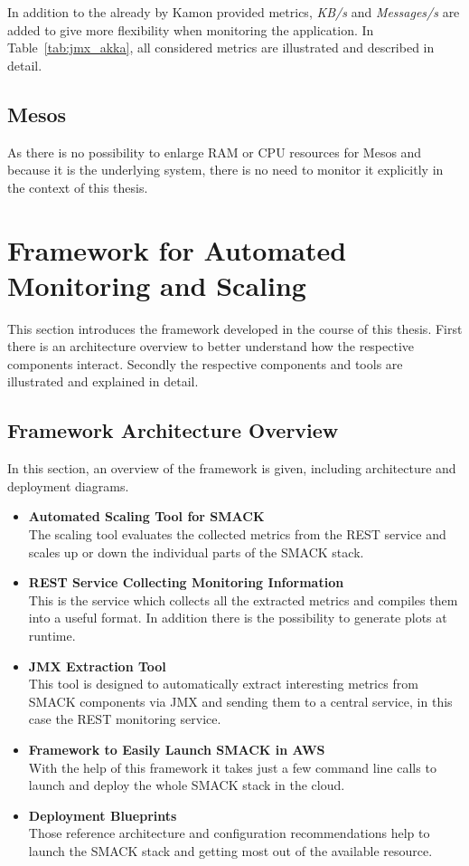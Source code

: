 In addition to the already by Kamon provided metrics, \textit{KB/s} and \textit{Messages/s} are added to give more flexibility when monitoring the application.
In Table~\ref{tab:jmx_akka}, all considered metrics are illustrated and described in detail.


\subsection{Mesos}
As there is no possibility to enlarge RAM or CPU resources for Mesos and because it is the underlying system, there is no need to monitor it explicitly in the context of this thesis.


\section{Framework for Automated Monitoring and Scaling}
This section introduces the framework developed in the course of this thesis.
First there is an architecture overview to better understand how the respective components interact.
Secondly the respective components and tools are illustrated and explained in detail.

\subsection{Framework Architecture Overview}
In this section, an overview of the framework is given, including architecture and deployment diagrams.

\begin{itemize}
    \item \textbf{Automated Scaling Tool for SMACK}\\
          The scaling tool evaluates the collected metrics from the REST service and scales up or down the individual parts of the SMACK stack.
    \item \textbf{REST Service Collecting Monitoring Information}\\
          This is the service which collects all the extracted metrics and compiles them into a useful format.
          In addition there is the possibility to generate plots at runtime.
    \item \textbf{JMX Extraction Tool}\\
          This tool is designed to automatically extract interesting metrics from SMACK components via JMX and sending them to a central service, in this case the REST monitoring service.
    \item \textbf{Framework to Easily Launch SMACK in AWS}\\
          With the help of this framework it takes just a few command line calls to launch and deploy the whole SMACK stack in the cloud.
    \item \textbf{Deployment Blueprints}\\
          Those reference architecture and configuration recommendations help to launch the SMACK stack and getting most out of the available resource.
\end{itemize}

